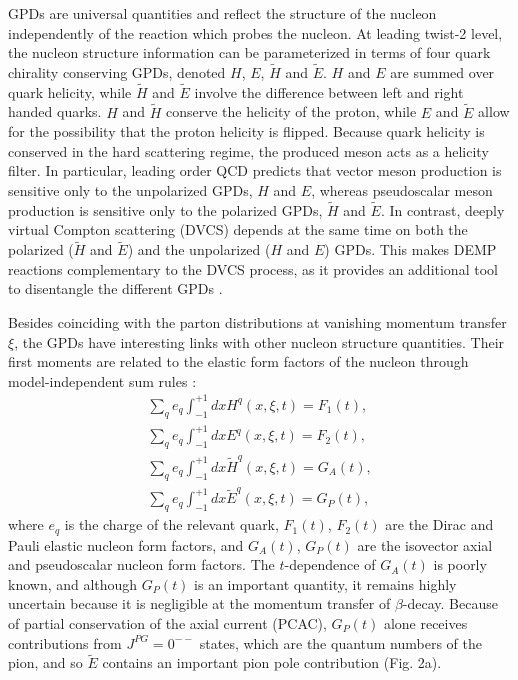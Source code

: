 \documentclass[preprint,superscriptaddress]{revtex4}
\begin{document}
GPDs are universal quantities and reflect the structure of the nucleon
independently of the reaction which probes the nucleon.  At leading twist-2
level, the nucleon structure information can  be parameterized in terms of four
quark chirality conserving GPDs, denoted $H$, $E$, $\tilde{H}$ and $\tilde{E}$.
$H$ and $E$ are summed over quark helicity, while $\tilde{H}$ and $\tilde{E}$
involve the difference between  left and right handed quarks.  $H$ and
$\tilde{H}$ conserve the helicity of the proton, while $E$ and $\tilde{E}$
allow for the possibility that the proton helicity is flipped.  Because quark
helicity is conserved in the hard scattering regime, the produced meson acts as
a helicity filter.  In particular, leading order QCD predicts that vector meson
production is sensitive only to the unpolarized GPDs, $H$ and $E$, whereas
pseudoscalar meson production is sensitive only to the polarized GPDs,
$\tilde{H}$ and $\tilde{E}$.  In contrast, deeply virtual Compton scattering
(DVCS) depends at the same time on both the polarized ($\tilde{H}$ and  
$\tilde{E}$) and the unpolarized ($H$ and $E$) GPDs.  This makes DEMP
reactions complementary to the DVCS process, as it
provides an additional tool to disentangle the different GPDs \cite{Go01}.

Besides coinciding with the parton distributions at vanishing momentum transfer
$\xi$, the GPDs have interesting links with other nucleon structure quantities.
Their first moments are related to the elastic form factors of the nucleon
through model-independent sum rules \cite{Ra00}:
\begin{eqnarray}
\sum_q e_q \int^{+1}_{-1} dx H^q(x,\xi,t) = F_1(t),\\
\sum_q e_q \int^{+1}_{-1} dx E^q(x,\xi,t) = F_2(t),\\
\sum_q e_q \int^{+1}_{-1} dx \tilde{H}^q(x,\xi,t) = G_A(t),\\
\sum_q e_q \int^{+1}_{-1} dx \tilde{E}^q(x,\xi,t) = G_P(t),
\end{eqnarray}
where $e_q$ is the charge of the relevant quark, $F_1(t)$, $F_2(t)$ are the
Dirac and Pauli elastic nucleon form factors, and $G_A(t)$, $G_P(t)$ are the
isovector axial and pseudoscalar nucleon form factors.  The $t$-dependence of
$G_A(t)$ is poorly known, and although $G_P(t)$ is an important quantity, it
remains highly uncertain because it is negligible at the momentum transfer of
$\beta$-decay\cite{Th01}.  Because of partial conservation of the axial current
(PCAC), $G_P(t)$ alone
receives contributions from $J^{PG}=0^{--}$ states\cite{Ma69}, which are the
quantum numbers of the pion, and so $\tilde{E}$ contains an important pion pole
contribution (Fig. 2a).
\end{document}
